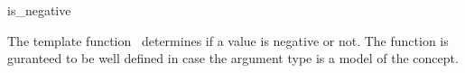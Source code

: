\begin{ccRefFunction}{is_negative}

\ccDefinition

The template function \ccRefName\ determines if a value is negative or not.
The function is guranteed to be well defined in case the argument type 
is a model of the  concept. 


{}

\ccSeeAlso
{} \\
\\

\end{ccRefFunction}
